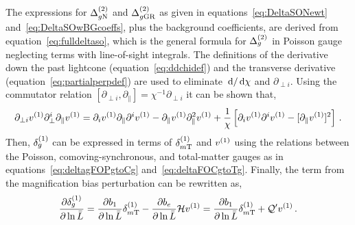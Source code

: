 The expressions for $\Delta^{(2)}_{g\mathrm{N}}$ and $\Delta^{(2)}_{g\mathrm{GR}}$ as given in equations~\eqref{eq:DeltaSONewt} and~\eqref{eq:DeltaSOwBGcoeffs}, plus the background coefficients, are derived from equation~\eqref{eq:fulldeltaso}, which is the general formula for $\Delta_g^{(2)}$ in Poisson gauge neglecting terms with line-of-sight integrals. The definitions of the derivative down the past lightcone (equation~\eqref{eq:ddchidef}) and the transverse derivative (equation~\eqref{eq:partialperpdef}) are used to eliminate $\,\mathrm{d}/\,\mathrm{d}\chi$ and $\partial_{\perp i}$. 
Using the commutator relation $\left[ \partial_{\perp i}, \partial_\parallel \right] = \chi^{-1} \partial_{\perp i}$ it can be shown that, 
\begin{equation}
	\partial_{\perp i}v^{(1)} \partial_\perp^i \partial_\parallel v^{(1)} = \partial_i v^{(1)} \partial_\parallel \partial^i v^{(1)} - \partial_\parallel v^{(1)} \partial_\parallel^2 v^{(1)} + \frac{1}{\chi} \left[ \partial_i v^{(1)} \partial^i v^{(1)} - [\partial_\parallel v^{(1)}]^2 \right]\,.
\end{equation}
Then, $\delta_g^{(1)}$ can be expressed in terms of $\delta_{m\mathrm{T}}^{(1)}$ and $v^{(1)}$ using the relations between the Poisson, comoving-synchronous, and total-matter gauges as in equations~\eqref{eq:deltagFOPgtoCg} and~\eqref{eq:deltaFOCgtoTg}. Finally, the term from the magnification bias perturbation can be rewritten as, 
\begin{equation}
	\frac{\partial \delta_g^{(1)}}{\partial\ln \bar{L}} = \frac{\partial b_1}{\partial\ln\bar{L}} \delta_{m\mathrm{T}}^{(1)} - \frac{\partial b_e}{\partial\ln\bar{L}} \mathcal{H} v^{(1)} = \frac{\partial b_1}{\partial\ln\bar{L}} \delta_{m\mathrm{T}}^{(1)} + \mathcal{Q}' v^{(1)} \,.
\end{equation}

